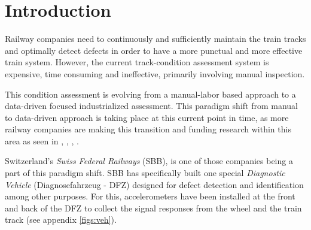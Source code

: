 



%



\maketitle

%
{
  \hypersetup{linkcolor=black}
  \tableofcontents
   
}
\newpage
\chapter{Introduction}
Railway companies need to continuously and sufficiently maintain the train tracks and optimally detect defects in order to have a more punctual and more effective train system. However, the current track-condition assessment system is expensive, time consuming and ineffective, primarily involving manual inspection. 

This condition assessment is evolving from a manual-labor based approach to a data-driven focused industrialized assessment. This paradigm shift from manual to data-driven approach is taking place at this current point in time, as more railway companies are making this transition and funding research within this area as seen in \cite{Sharma2018DatadrivenOO}, \cite{modeltrain}, \cite{Deutsche21:online}, \cite{Howdigit41:online}.

Switzerland's \textit{Swiss Federal Railways} (SBB), is one of those companies being a part of this paradigm shift. SBB has specifically built one special \textit{Diagnostic Vehicle} (Diagnosefahrzeug - DFZ) designed for defect detection and identification among other purposes. For this, accelerometers have been installed at the front and back of the DFZ to collect the signal responses from the wheel and the train track (see appendix \ref{figs:veh}).

